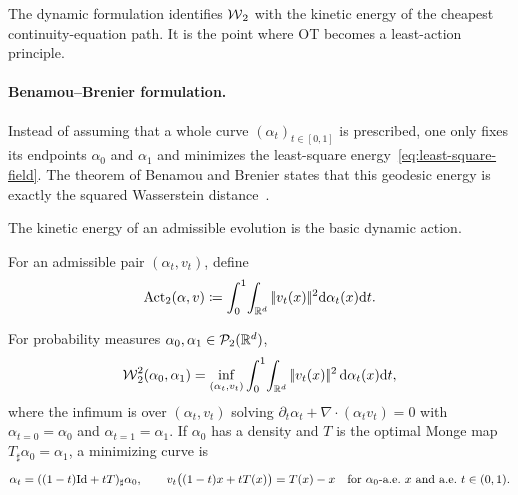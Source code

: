 The dynamic formulation identifies $\operatorname{\mathcal{W}}_2$ with the kinetic energy of the cheapest continuity-equation path. It is the point where OT becomes a least-action principle.

\paragraph{Benamou--Brenier formulation.}

Instead of assuming that a whole curve $(\alpha_t)_{t\in[0,1]}$ is prescribed, one only fixes its endpoints $\alpha_0$ and $\alpha_1$ and minimizes the least-square energy~\eqref{eq:least-square-field}. The theorem of Benamou and Brenier states that this geodesic energy is exactly the squared Wasserstein distance~\cite{benamou2000computational}.

The kinetic energy of an admissible evolution is the basic dynamic action.
\begin{defn}\label{def-benamou-brenier-action}
For an admissible pair $(\alpha_t,v_t)$, define
\[
\operatorname{Act}_2(\alpha,v)
\coloneqq
\int_0^1\!\int_{\mathbb{R}^d}|\!| v_t(x) |\!|^2\mathrm{d}\alpha_t(x)\mathrm{d} t.
\]
\end{defn}

\begin{thm}\label{thm-benamou-brenier}
	For probability measures $\alpha_0,\alpha_1\in\mathcal{P}_2(\mathbb{R}^d)$,
	\begin{equation}\label{eq:benamou-brenier}
	\operatorname{\mathcal{W}}_2^2(\alpha_0,\alpha_1)
	=
	\inf_{(\alpha_t,v_t)}
	\int_0^1\!\int_{\mathbb{R}^d}|\!| v_t(x) |\!|^2\,\mathrm{d}\alpha_t(x)\mathrm{d} t,
	\end{equation}
	where the infimum is over $(\alpha_t,v_t)$ solving $\partial_t\alpha_t+\nabla\!\cdot(\alpha_t v_t)=0$ with $\alpha_{t=0}=\alpha_0$ and $\alpha_{t=1}=\alpha_1$. If $\alpha_0$ has a density and $T$ is the optimal Monge map $T_\sharp\alpha_0=\alpha_1$, a minimizing curve is
	\begin{equation}\label{eq:static-to-dynamic}
		\alpha_t=((1-t)\Id+tT)_\sharp\alpha_0,
		\qquad
		v_t\big((1-t)x+tT(x)\big)=T(x)-x
		\quad\text{for $\alpha_0$-a.e.\ $x$ and a.e.\ $t\in(0,1)$}.
	\end{equation}
\end{thm}

